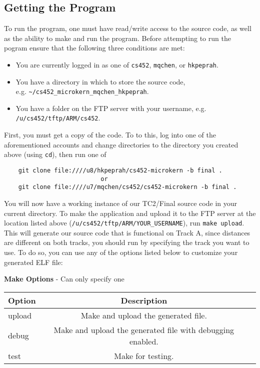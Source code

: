\documentclass[12pt]{article}
\begin{document}
\subsection{Getting the Program}
To run the program, one must have read/write access to the source code, as well as the ability to make and run the program.  Before attempting to run the pogram ensure that the following three conditions are met:
\begin{itemize}
  \item You are currently logged in as one of \texttt{cs452}, \texttt{mqchen}, or \texttt{hkpeprah}.
  \item You have a directory in which to store the source code, \\ e.g. \texttt{\textasciitilde/cs452\_microkern\_mqchen\_hkpeprah}.
  \item You have a folder on the FTP server with your username, e.g. \texttt{/u/cs452/tftp/ARM/cs452}.
\end{itemize}
First, you must get a copy of the code.  To to this, log into one of the aforementioned accounts and change directories to the directory you created above (using \texttt{cd}), then run one of
\begin{center}
  \begin{verbatim}
    git clone file:////u8/hkpeprah/cs452-microkern -b final .
                           or
    git clone file:////u7/mqchen/cs452/cs452-microkern -b final .
  \end{verbatim}
\end{center}
\vspace{-0.5cm}You will now have a working instance of our TC2/Final source code in your current directory.  To make the application and upload it to the FTP server at the location listed above (\texttt{/u/cs452/tftp/ARM/YOUR\_USERNAME}), run \texttt{make upload}.  This will generate our source code that is functional on Track A, since distances are different on both tracks, you should run by specifying the track you want to use.  To do so, you can use any of the options listed below to customize your generated ELF file:
\begin{center}
  {\bf Make Options} - Can only specify one
  \begin{tabular}{|l|c|c|}
    \hline
    {\bf Option} & {\bf Description} \\\hline
    upload & Make and upload the generated file. \\\hline
    debug & Make and upload the generated file with debugging enabled. \\\hline
    test & Make for testing. \\\hline
  \end{tabular}
\end{center}
\end{document}
